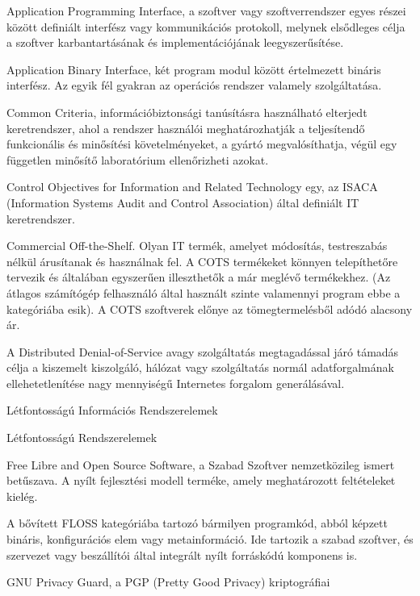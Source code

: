 \documentclass[12pt,magyar,a4paper,oneside]{scrreprt}
\providecommand{\tightlist}{%
  \setlength{\itemsep}{0pt}\setlength{\parskip}{0pt}}
\begin{document}
\begin{description}
\tightlist
\item[ABI]
Application Programming Interface, a szoftver vagy szoftverrendszer
egyes részei között definiált interfész vagy kommunikációs protokoll,
melynek elsődleges célja a szoftver karbantartásának és
implementációjának leegyszerűsítése.
\item[ABI]
Application Binary Interface, két program modul között értelmezett
bináris interfész. Az egyik fél gyakran az operációs rendszer valamely
szolgáltatása.
\item[CC]
Common Criteria, információbiztonsági tanúsításra használható elterjedt
keretrendszer, ahol a rendszer használói meghatározhatják a teljesítendő
funkcionális és minősítési követelményeket, a gyártó megvalósíthatja,
végül egy független minősítő laboratórium ellenőrizheti azokat.
\item[COBIT]
Control Objectives for Information and Related Technology egy, az ISACA
(Information Systems Audit and Control Association) által definiált IT
keretrendszer.
\item[COTS]
Commercial Off-the-Shelf. Olyan IT termék, amelyet módosítás,
testreszabás nélkül árusítanak és használnak fel. A COTS termékeket
könnyen telepíthetőre tervezik és általában egyszerűen illeszthetők a
már meglévő termékekhez. (Az átlagos számítógép felhasználó által
használt szinte valamennyi program ebbe a kategóriába esik). A COTS
szoftverek előnye az tömegtermelésből adódó alacsony ár.
\item[DDOS]
A Distributed Denial-of-Service avagy szolgáltatás megtagadással járó
támadás célja a kiszemelt kiszolgáló, hálózat vagy szolgáltatás normál
adatforgalmának ellehetetlenítése nagy mennyiségű Internetes forgalom
generálásával.
\item[LIRE]
Létfontosságú Információs Rendszerelemek
\item[LRE]
Létfontosságú Rendszerelemek
\item[FLOSS]
Free Libre and Open Source Software, a Szabad Szoftver nemzetközileg
ismert betűszava. A nyílt fejlesztési modell terméke, amely
meghatározott feltételeket kielég.
\item[FLOSS elem]
A bővített FLOSS kategóriába tartozó bármilyen programkód, abból képzett
bináris, konfigurációs elem vagy metainformáció. Ide tartozik a szabad
szoftver, és szervezet vagy beszállítói által integrált nyílt forráskódú
komponens is.
\item[GPG]
GNU Privacy Guard, a PGP (Pretty Good Privacy) kriptográfiai

\end{description}
\end{document}
